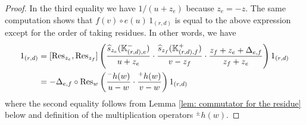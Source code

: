 \documentclass[10pt]{amsart}
\newcommand{\BK}{\mathbb{K}}
\newcommand{\+}{{}^+}
\newcommand{\Res}{\textnormal{Res}}
\theoremstyle{definition}
\theoremstyle {definition}
\theoremstyle {definition}
\begin{document}
\begin{proof}
In the third equality we have $1/(u+z_e)$ because $z_e=-z$. The same computation shows that $f(v)\circ e(u)\, 1_{(r,d)}$ is equal to the above expression except for the order of taking residues. In other words, we have
\begin{align*}
     [e(u), f(v)] 1_{(r,d)} 
     &= [\Res_{z_e},\Res_{z_f}]\left(
    \frac{\widehat s_{z_e}(\BK^-_{(r,d),e})}{u+z_e}\cdot \frac{\widehat s_{z_f}(\BK^+_{(r,d),f})}{v-z_f}\cdot \frac{z_f+z_e+\Delta_{e,f}}{z_f+z_e}
    \right)1_{(r,d)}\\
    &= - \Delta_{e,f}\circ \Res_w\left(
    \frac{{}^{-}h(w)}{u-w}\cdot \frac{{}^{+}h(w)}{v-w}
    \right)1_{(r,d)}
\end{align*}
where the second equality follows from Lemma \ref{lem: commutator for the residue} below and definition of the multiplication operators ${}^{\pm}h(w)$.


\end{proof}
\end{document}
